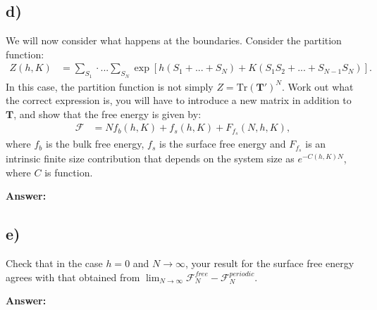 \documentclass[a4paper]{article}
\newcommand{\trace}{\text{Tr}}
\newcommand{\newparagraph}{\vspace{.5cm}\noindent}
\begin{document}
\subsection*{d)} 
We will now consider what happens at the boundaries. Consider the partition function:
\begin{align*}
    Z(h, K) &= \sum_{S_1}\cdot...\sum_{S_N} \exp\left[h\left(S_1 + ...+ S_N\right) + K\left(S_1S_2 + ... + S_{N-1}S_N\right)\right].
\end{align*}In this case, the partition function is not simply $Z = \trace\left(\mathbf{T}'\right)^N$.
Work out what the correct expression is, you will have to introduce a new matrix in addition to $\mathbf{T}$, and show that the free energy is given by:
\begin{align*}
    \mathcal{F} &= N f_b(h, K) + f_s(h, K) + F_{f_s}(N, h, K),
\end{align*}where $f_b$ is the bulk free energy, $f_s$ is the surface free energy and $F_{f_s}$ is an intrinsic finite size contribution that depends on the system size as $e^{-C(h, K)N}$, where $C$ is function.

\newparagraph
\textbf{Answer:}
\subsection*{e)}
Check that in the case $h = 0$ and $N\to\infty$, your result for the surface free energy agrees with that obtained from $\lim_{N\to\infty}\mathcal{F}_N^{free}- \mathcal{F}_N^{periodic}$.

\newparagraph
\textbf{Answer:}
\end{document}
